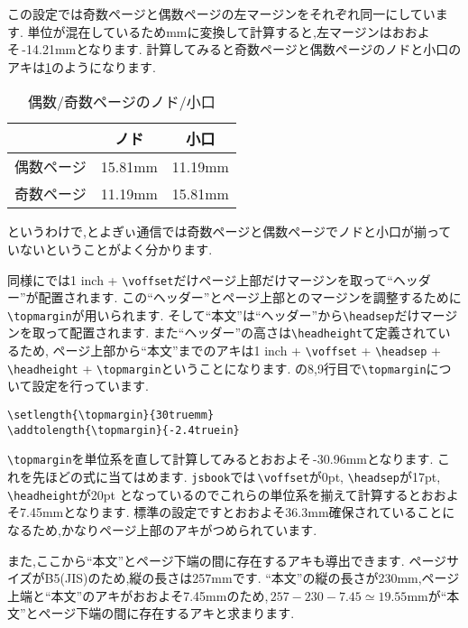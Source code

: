 この設定では奇数ページと偶数ページの左マージンをそれぞれ同一にしています.
単位が混在しているためmmに変換して計算すると,左マージンはおおよそ\,-14.21mmとなります.
計算してみると奇数ページと偶数ページのノドと小口のアキは\tablename\ref{tbl:oddevenmargins}のようになります.
\begin{table}[!ht]
	\centering
	\caption{偶数/奇数ページのノド/小口}
	\label{tbl:oddevenmargins}
	\begin{tabular}{c|cc} \hline \hline
		& ノド & 小口 \\ \hline
		偶数ページ & 15.81mm & 11.19mm \\
		奇数ページ & 11.19mm & 15.81mm \\ \hline
	\end{tabular}
\end{table} 

というわけで,とよぎぃ通信では奇数ページと偶数ページでノドと小口が揃っていないということがよく分かります.

同様に{\pLaTeX}では1 inch + \verb|\voffset|だけページ上部だけマージンを取って``ヘッダー''が配置されます.
この``ヘッダー''とページ上部とのマージンを調整するために\verb|\topmargin|が用いられます.
そして``本文''は``ヘッダー''から\verb|\headsep|だけマージンを取って配置されます.
また``ヘッダー''の高さは\verb|\headheight|て定義されているため,
ページ上部から``本文''までのアキは1 inch + \verb|\voffset| + \verb|\headsep| + \verb|\headheight| + \verb|\topmargin|ということになります.
の8,9行目で\verb|\topmargin|について設定を行っています.
\begin{verbatim}
\setlength{\topmargin}{30truemm}
\addtolength{\topmargin}{-2.4truein}
\end{verbatim}
\verb|\topmargin|を単位系を直して計算してみるとおおよそ\,-30.96mmとなります.
これを先ほどの式に当てはめます. 
\verb|jsbook|では\,\verb|\voffset|が0pt, \verb|\headsep|が17pt, \verb|\headheight|が20pt
となっているのでこれらの単位系を揃えて計算するとおおよそ7.45mmとなります.
標準の設定ですとおおよそ36.3mm確保されていることになるため,かなりページ上部のアキがつめられています.

また,ここから``本文''とページ下端の間に存在するアキも導出できます.
ページサイズがB5(JIS)のため,縦の長さは257mmです.
``本文''の縦の長さが230mm,ページ上端と``本文''のアキがおおよそ7.45mmのため,\,$257 - 230 - 7.45 \simeq 19.55\mathrm{mm}$が``本文''とページ下端の間に存在するアキと求まります.


